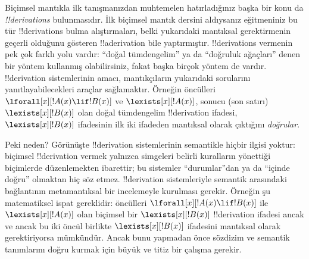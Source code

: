 \documentclass[../../../include/open-logic-section]{subfiles}
\begin{document}
Biçimsel mantıkla ilk tanışmanızdan muhtemelen hatırladığınız başka bir
konu da \emph{!!{derivation}s} bulunmasıdır. İlk biçimsel mantık
dersini aldıysanız eğitmeniniz bu tür !!{derivation}s bulma
alıştırmaları, belki yukarıdaki mantıksal gerektirmenin geçerli
olduğunu gösteren !!a{derivation} bile yaptırmıştır. !!{derivation}s
vermenin pek çok farklı yolu vardır: ``doğal tümdengelim'' ya da
``doğruluk ağaçları'' denen bir yöntem kullanmış olabilirsiniz, fakat
başka birçok yöntem de vardır. !!{derivation} sistemlerinin amacı,
mantıkçıların yukarıdaki sorularını yanıtlayabilecekleri araçlar
sağlamaktır. Örneğin öncülleri
$\lforall[x][!A(x)\lif !B(x)]$ ve $\lexists[x][!A(x)]$, sonucu (son
satırı) $\lexists[x][!B(x)]$ olan doğal tümdengelim
!!{derivation} ifadesi, $\lexists[x][!B(x)]$ ifadesinin ilk iki
ifadeden mantıksal olarak çıktığını \emph{doğrular}.

Peki neden? Görünüşte !!{derivation} sistemlerinin semantikle hiçbir
ilgisi yoktur: biçimsel !!{derivation} vermek yalnızca simgeleri
belirli kuralların yönettiği biçimlerde düzenlemekten ibarettir; bu
sistemler ``durumlar''dan ya da ``içinde doğru'' olmaktan hiç söz
etmez. !!{derivation} sistemleriyle semantik arasındaki bağlantının
metamantıksal bir incelemeyle kurulması gerekir. Örneğin şu matematiksel
ispat gereklidir: öncülleri $\lforall[x][!A(x)\lif !B(x)]$ ile
$\lexists[x][!A(x)]$ olan biçimsel bir
$\lexists[x][!B(x)]$ !!{derivation} ifadesi ancak ve ancak bu iki öncül
birlikte $\lexists[x][!B(x)]$ ifadesini mantıksal olarak gerektiriyorsa
mümkündür. Ancak bunu yapmadan önce sözdizim ve semantik tanımlarını
doğru kurmak için büyük ve titiz bir çalışma gerekir.
\end{document}
